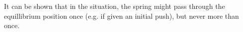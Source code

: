 \begin{applicationActivities}
\begin{observation}
It can be shown that in the  situation, the spring might pass through the equillibrium position once (e.g. if given an initial push), but never more than once.
\end{observation}


\end{applicationActivities}
